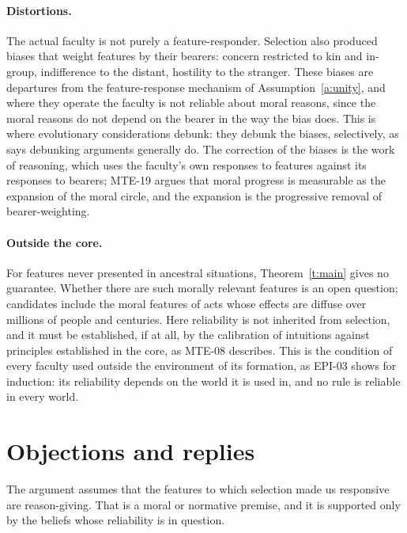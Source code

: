 \documentclass{situationist-preprint}
\begin{document}
\paragraph{Distortions.} The actual faculty is not purely a feature-responder. Selection also produced biases that weight features by their bearers: concern restricted to kin and in-group, indifference to the distant, hostility to the stranger. These biases are departures from the feature-response mechanism of Assumption~\ref{a:unity}, and where they operate the faculty is not reliable about moral reasons, since the moral reasons do not depend on the bearer in the way the bias does. This is where evolutionary considerations debunk: they debunk the biases, selectively, as \citet{Kahane2011} says debunking arguments generally do. The correction of the biases is the work of reasoning, which uses the faculty's own responses to features against its responses to bearers; MTE-19 argues that moral progress is measurable as the expansion of the moral circle, and the expansion is the progressive removal of bearer-weighting.

\paragraph{Outside the core.} For features never presented in ancestral situations, Theorem~\ref{t:main} gives no guarantee. Whether there are such morally relevant features is an open question; candidates include the moral features of acts whose effects are diffuse over millions of people and centuries. Here reliability is not inherited from selection, and it must be established, if at all, by the calibration of intuitions against principles established in the core, as MTE-08 describes. This is the condition of every faculty used outside the environment of its formation, as EPI-03 shows for induction: its reliability depends on the world it is used in, and no rule is reliable in every world.

\section{Objections and replies}

\begin{objection}
The argument assumes that the features to which selection made us responsive are reason-giving. That is a moral or normative premise, and it is supported only by the beliefs whose reliability is in question.
\end{objection}
\end{document}
